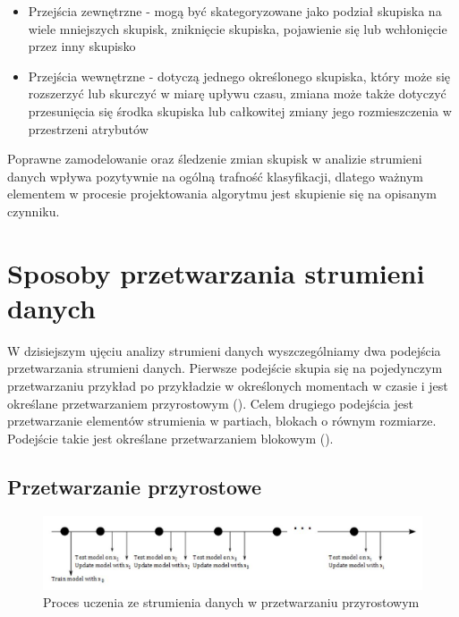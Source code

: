 \begin{itemize}
    \item Przejścia zewnętrzne - mogą być skategoryzowane jako podział skupiska na wiele mniejszych skupisk, zniknięcie skupiska, pojawienie się lub wchłonięcie przez inny skupisko
    \item Przejścia wewnętrzne - dotyczą jednego określonego skupiska, który może się rozszerzyć lub skurczyć w miarę upływu czasu, zmiana może także dotyczyć przesunięcia się środka skupiska lub całkowitej zmiany jego rozmieszczenia w przestrzeni atrybutów
\end{itemize}

\noindent Poprawne zamodelowanie oraz śledzenie zmian skupisk w analizie strumieni danych wpływa pozytywnie na ogólną trafność klasyfikacji, dlatego ważnym elementem w procesie projektowania algorytmu jest skupienie się na opisanym czynniku.

\section{Sposoby przetwarzania strumieni danych}

\noindent W dzisiejszym ujęciu analizy strumieni danych wyszczególniamy dwa podejścia przetwarzania strumieni danych. Pierwsze podejście skupia się na pojedynczym przetwarzaniu przykład po przykładzie w określonych momentach w czasie i jest określane przetwarzaniem przyrostowym (). Celem drugiego podejścia jest przetwarzanie elementów strumienia w partiach, blokach o równym rozmiarze. Podejście takie jest określane przetwarzaniem blokowym ().

\subsection{Przetwarzanie przyrostowe}

\begin{figure}[h] 
    \centering
    \includegraphics[width=15cm]{figures/online_processing.JPG}
    \caption{Proces uczenia ze strumienia danych w przetwarzaniu przyrostowym \cite{BrzezPhd2015}}\label{Figure:OnlineProcessing}
\end{figure}

